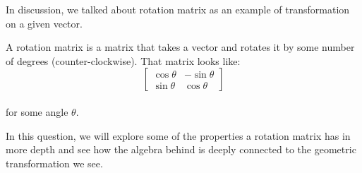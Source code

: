 In discussion, we talked about rotation matrix as an example of transformation on a given vector. 

A rotation matrix is a matrix that takes a vector and rotates it by some number of degrees (counter-clockwise). That matrix looks like: \\
  $$\begin{bmatrix}
  \cos{\theta} & -\sin{\theta} \\
  \sin{\theta} & \cos{\theta} \end{bmatrix}$$ \\

  for some angle $\theta$. 

  In this question, we will explore some of the properties a rotation matrix has in more depth and see how the algebra behind is deeply connected to the geometric transformation we see.


